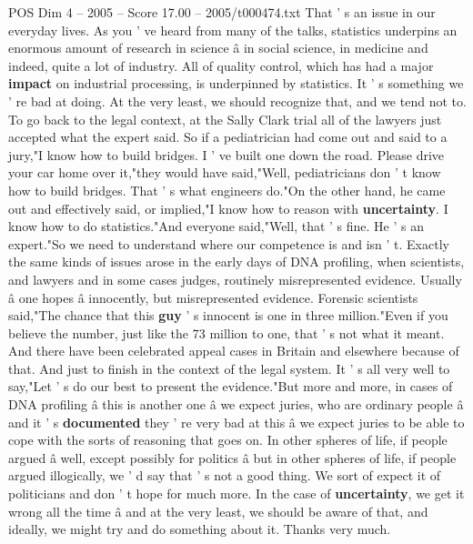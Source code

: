 \begin{textsample}{POS Dim 4 – 2005 – Score 17.00 – 2005/t000474.txt}
That ' s an issue in our everyday lives.
As you ' ve heard from many of the talks, statistics underpins an enormous amount of research in science â in social science, in medicine and indeed, quite a lot of industry.
All of quality control, which has had a major \textbf{impact} on industrial processing, is underpinned by statistics.
It ' s something we ' re bad at doing.
At the very least, we should recognize that, and we tend not to.
To go back to the legal context, at the Sally Clark trial all of the lawyers just accepted what the expert said.
So if a pediatrician had come out and said to a jury,"I know how to build bridges.
I ' ve built one down the road.
Please drive your car home over it,"they would have said,"Well, pediatricians don ' t know how to build bridges.
That ' s what engineers do."On the other hand, he came out and effectively said, or implied,"I know how to reason with \textbf{uncertainty}.
I know how to do statistics."And everyone said,"Well, that ' s fine.
He ' s an expert."So we need to understand where our competence is and isn ' t.
Exactly the same kinds of issues arose in the early days of DNA profiling, when scientists, and lawyers and in some cases judges, routinely misrepresented evidence.
Usually â one hopes â innocently, but misrepresented evidence.
Forensic scientists said,"The chance that this \textbf{guy} ' s innocent is one in three million."Even if you believe the number, just like the 73 million to one, that ' s not what it meant.
And there have been celebrated appeal cases in Britain and elsewhere because of that.
And just to finish in the context of the legal system.
It ' s all very well to say,"Let ' s do our best to present the evidence."But more and more, in cases of DNA profiling â this is another one â we expect juries, who are ordinary people â and it ' s \textbf{documented} they ' re very bad at this â we expect juries to be able to cope with the sorts of reasoning that goes on.
In other spheres of life, if people argued â well, except possibly for politics â but in other spheres of life, if people argued illogically, we ' d say that ' s not a good thing.
We sort of expect it of politicians and don ' t hope for much more.
In the case of \textbf{uncertainty}, we get it wrong all the time â and at the very least, we should be aware of that, and ideally, we might try and do something about it.
Thanks very much.

\end{textsample}
